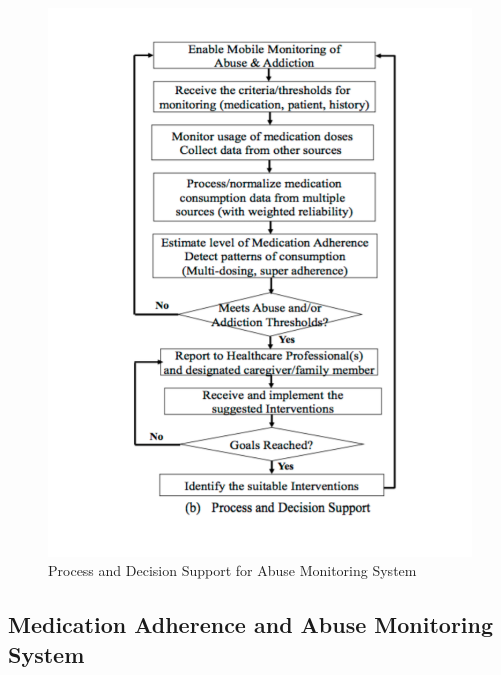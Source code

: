 \documentclass[sigconf]{acmart}
\begin{document}
\begin{figure}[!ht]
  \centering\includegraphics[width=\columnwidth]{images/Figure2.pdf}
  \caption{Process and Decision Support for Abuse Monitoring System 
  \cite{Varshney14}
  }\label{f:Figure2}
\end{figure}

\subsection{Medication Adherence and Abuse Monitoring System}
\end{document}

